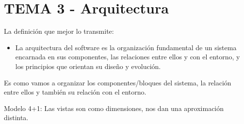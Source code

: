 \documentclass[12pt, twoside, openright]{report} %
\begin{document}
\chapter{TEMA 3 - Arquitectura}


La definición que mejor lo transmite:

\begin{itemize}
	\item La arquitectura del software es la organización fundamental de un
	      sistema encarnada en sus componentes, las relaciones entre ellos y
	      con el entorno, y los principios que orientan su diseño y
	      evolución.
\end{itemize}

Es como vamos a organizar los componentes/bloques del sistema, la
relación entre ellos y también su relación con el entorno.

Modelo 4+1: Las vistas son como dimensiones, nos dan una
aproximación distinta.
\end{document}
